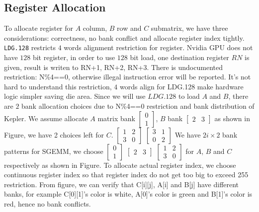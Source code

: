\documentclass{sig-alternate-05-2015}
\begin{document}
\subsection{Register Allocation}

To allocate register for $A$ column, $B$ row and $C$ submatrix, we have three considerations: correctness, no bank
conflict and allocate register index tightly.
{\tt LDG.128} restricts $4$ words alignment restriction for register.
Nvidia GPU does not have $128$ bit register, in order to use $128$ bit load, one destination register $RN$ is given, result is writen to
RN+1, RN+2, RN+3. There is undocumented restriction: N\%4==0, otherwise illegal instruction error will be reported.
It's not hard to understand this restriction, $4$ words align for LDG.128 make hardware logic simpler saving die area.
Since we will use $LDG.128$ to load $A$ and $B$, there are $2$ bank allocation choices due to N\%4==0 restriction and
bank distribution of Kepler. We assume allocate $A$ matrix bank $\begin{bmatrix} 0 \\ 1  \end{bmatrix}$,
$B$ bank $\begin{bmatrix} 2 & 3 \end{bmatrix}$ as shown in Figure, we have 2 choices left for $C$.
$\begin{bmatrix} 1 & 2 \\ 3 & 0  \end{bmatrix}$
$\begin{bmatrix} 3 & 1 \\ 0 & 2  \end{bmatrix}$
We have $2i\times2$ bank patterns for SGEMM, we choose $\begin{bmatrix} 0 \\ 1  \end{bmatrix}$ $\begin{bmatrix} 2 & 3 \end{bmatrix}$
$\begin{bmatrix} 1 & 2 \\ 3 & 0  \end{bmatrix}$ for $A$, $B$ and $C$ respectively as shown in Figure.
To allocate actual register index, we choose continuous register index so that register index do not get too big to
exceed 255 restriction. From figure, we can verify that C[i][j], A[i] and B[j] have different banks, for example
C[0][1]'s color is white, A[0]'s color is green and B[1]'s color is red, hence no bank conflicts.
\end{document}

